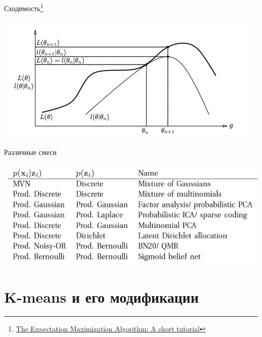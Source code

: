 \documentclass[aspectratio=169]{beamer}
\begin{document}
\begin{frame}{Сходимость\footnote{\href{http://www.cs.cmu.edu/~dgovinda/pdf/recog/EM_algorithm-1.pdf}{The Expectation Maximization Algorithm: A short tutorial}}}

\begin{center}
\includegraphics[scale=0.6]{images/convergence.png}
\end{center}

\end{frame}

\begin{frame}{Различные смеси}

\begin{center}
\includegraphics[scale=0.4]{images/mixtures.png}
\end{center}

\end{frame}

\section{K-means и его модификации}
\end{document}
